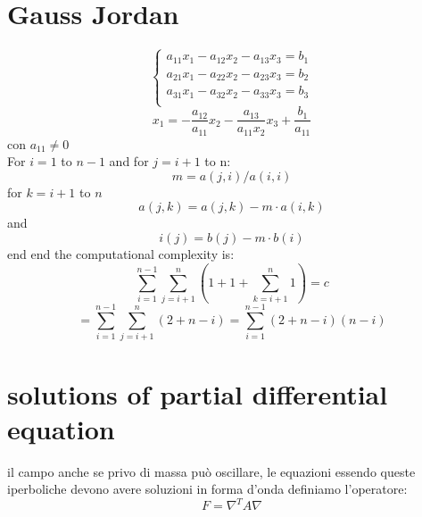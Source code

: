 \section{Gauss Jordan}
$$\begin{cases}
   a_{11}x_1-a_{12}x_2-a_{13}x_3=b_1 \\
   a_{21}x_1-a_{22}x_2-a_{23}x_3=b_2 \\
   a_{31}x_1-a_{32}x_2-a_{33}x_3=b_3 \\

\end{cases}$$
\[x_1=-\frac{a_{12}}{a_{11}}x_2-\frac{a_{13}}{a_{11}x_2}x_3+\frac{b_1}{a_{11}}\] con $a_{11} \neq 0$
\\
For $i=1$ to $n-1$ and for $j=i+1$ to n:
$$m=a(j,i)/a(i,i)$$
for $k=i+1$ to $n$
$$a(j,k)=a(j,k)-m\cdot a(i,k)$$
and
\[i(j)=b(j)-m \cdot b(i)\]
end
end
the computational complexity is:
\[\sum^{n-1}_{i=1}\sum^n_{j=i+1}(1+1+\sum^n_{k=i+1}1)=c\]
\[=\sum^{n-1}_{i=1}\sum^n_{j=i+1}(2+n-i)=\sum^{n-1}_{i=1}(2+n-i)(n-i)\]

\section{solutions of partial differential equation}
il campo anche se privo di massa può oscillare, le equazioni essendo queste iperboliche devono avere soluzioni in forma d'onda
definiamo l'operatore:
\[F=\nabla^T A \nabla \]



